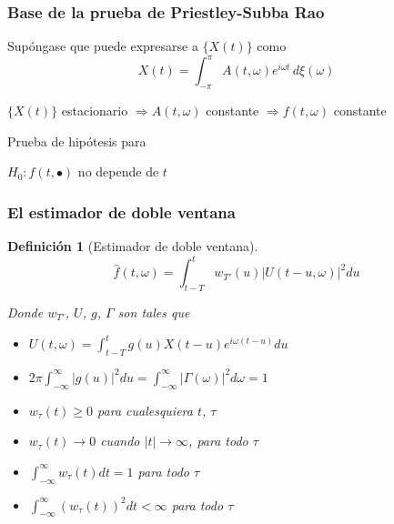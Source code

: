 \documentclass[11pt]{beamer}
\newtheorem{defn}{Definición}
\newcommand{\est}[1]{\widehat{ #1 }}
\newcommand{\abso}[1]{\left| #1 \right|}
\begin{document}

\begin{frame}\frametitle{Base de la prueba de Priestley-Subba Rao}
Supóngase que puede expresarse a $\{X(t)\}$ como
\begin{equation*}
X(t) = \int_{-\pi}^{\pi} A(t,\omega) e^{i\omega t} \, d\xi(\omega)
\end{equation*}

\begin{center}
$\{ X(t) \}$ estacionario $\Rightarrow A(t,\omega)$ constante $\Rightarrow f(t,\omega)$ constante
\end{center}

\pause

Prueba de hipótesis para

\begin{center}
$H_0 : f(t,\bullet)$ no depende de $t$
\end{center}
\end{frame}


\begin{frame}\frametitle{El estimador de doble ventana}
\begin{defn}[Estimador de doble ventana]
\begin{equation*}
\widehat{f}(t,\omega) = \int_{t-T}^{t} w_{T'}(u) \lvert U(t-u,\omega) \lvert^{2} du
\end{equation*}

Donde $w_{T'}$, $U$, $g$, $\Gamma$ son tales que
\begin{small}
\begin{itemize}
\item $U(t,\omega) = \int_{t-T}^{t} g(u) X({t-u}) e^{i \omega (t-u)} du$
\item $2\pi \int_{-\infty}^{\infty} \lvert g(u) \lvert^{2} du = 
\int_{-\infty}^{\infty} \lvert \Gamma(\omega) \lvert^{2} d\omega = 1$
\item $w_{\tau}(t) \geq 0$ para cualesquiera $t$, $\tau$
\item $w_{\tau}(t) \rightarrow 0$ cuando $\lvert t \lvert \rightarrow \infty$, para todo $\tau$
\item $\int_{-\infty}^{\infty} w_{\tau}(t) dt = 1$ para todo $\tau$
\item $ \int_{-\infty}^{\infty} \left( w_{\tau}(t) \right)^{2} dt < \infty$ para todo $\tau$
\end{itemize}
\end{small}
\end{defn}
\end{frame}
\end{document}
